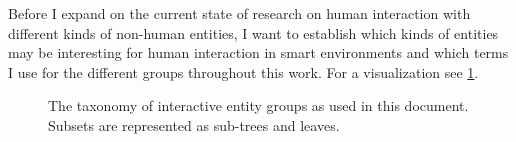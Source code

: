 Before I expand on the current state of research on human interaction with different kinds of non-human entities, I want to establish which kinds of entities may be interesting for human interaction in \glspl{smart environment} and which terms I use for the different groups throughout this work.
For a visualization see \cref{fig:rw.entities}.
\begin{figure}[htb]
    \centering
    \small
    \caption[Taxonomy of interactive entities.]{\label{fig:rw.entities} 
    The taxonomy of \gls{interactive entity} groups as used in this document.
    Subsets are represented as sub-trees and leaves.
    }
\end{figure}

